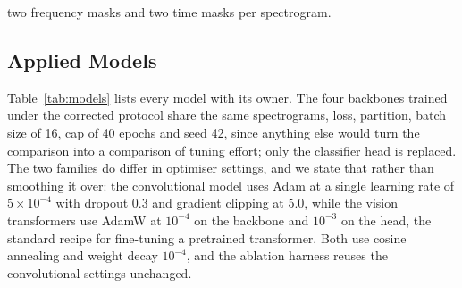 \documentclass[journal,onecolumn]{IEEEtran}
\begin{document}
two frequency masks and two time masks per spectrogram.

\subsection{Applied Models}
\label{subsec:models}

Table~\ref{tab:models} lists every model with its owner. The four backbones trained under the
corrected protocol share the same spectrograms, loss, partition, batch size of 16, cap of 40
epochs and seed 42, since anything else would turn the comparison into a comparison of tuning
effort; only the classifier head is replaced. The two families do differ in optimiser settings,
and we state that rather than smoothing it over: the convolutional model uses Adam at a single
learning rate of $5\times10^{-4}$ with dropout 0.3 and gradient clipping at 5.0, while the
vision transformers use AdamW at $10^{-4}$ on the backbone and $10^{-3}$ on the head, the
standard recipe for fine-tuning a pretrained transformer. Both use cosine annealing and weight
decay $10^{-4}$, and the ablation harness reuses the convolutional settings unchanged.
\end{document}
